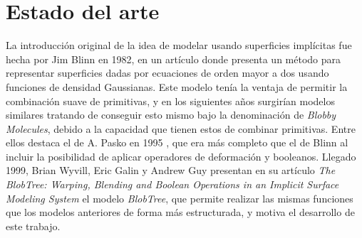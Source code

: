\chapter{Estado del arte}
La introducción original de la idea de modelar usando superficies implícitas fue hecha por Jim Blinn en 1982, en un artículo \cite{blinn1982generalization} donde presenta un método para representar superficies dadas por ecuaciones de orden mayor a dos usando funciones de densidad Gaussianas. Este modelo tenía la ventaja de permitir la combinación suave de primitivas, y en los siguientes años surgirían modelos similares tratando de conseguir esto mismo bajo la denominación de \textit{Blobby Molecules}, debido a la capacidad que tienen estos de combinar primitivas. Entre ellos destaca el de A. Pasko en 1995 \cite{pasko1995function}, que era más completo que el de Blinn al incluir la posibilidad de aplicar operadores de deformación y booleanos. Llegado 1999, Brian Wyvill, Eric Galin y Andrew Guy presentan en su artículo \textit{The BlobTree: Warping, Blending and Boolean Operations in an Implicit Surface Modeling System} \cite{blobtree} el modelo \textit{BlobTree}, que permite realizar las mismas funciones que los modelos anteriores de forma más estructurada, y motiva el desarrollo de este trabajo.\newline

